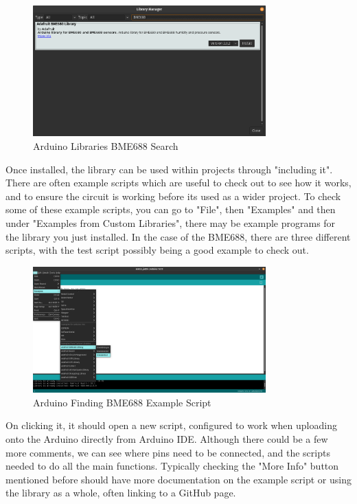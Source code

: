 \documentclass[a4paper,11pt]{report}
\begin{document}
\begin{figure}[H]
\centering
\includegraphics[width=0.8\textwidth]{screenshots/arduinolibrariessearch}
\caption{Arduino Libraries BME688 Search}
\end{figure}

Once installed, the library can be used within projects through "including it". There are often example scripts which are useful to check out to see how it works, and to ensure the circuit is working before its used as a wider project. To check some of these example scripts, you can go to "File", then "Examples" and then under "Examples from Custom Libraries", there may be example programs for the library you just installed. In the case of the BME688, there are three different scripts, with the test script possibly being a good example to check out.

\begin{figure}[H]
\centering
\includegraphics[width=0.8\textwidth]{screenshots/arduinobme688examplescriptfind}
\caption{Arduino Finding BME688 Example Script}
\end{figure}

On clicking it, it should open a new script, configured to work when uploading onto the Arduino directly from Arduino IDE. Although there could be a few more comments, we can see where pins need to be connected, and the scripts needed to do all the main functions. Typically checking the "More Info" button mentioned before should have more documentation on the example script or using the library as a whole, often linking to a GitHub page.
\end{document}
